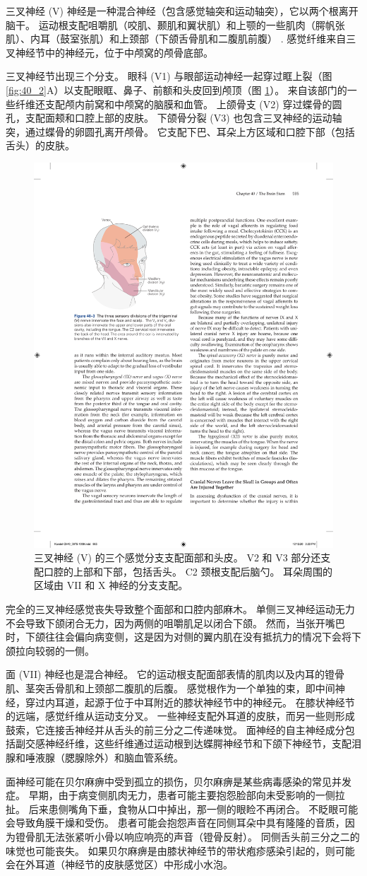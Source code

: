 三叉神经 (V) 神经是一种混合神经（包含感觉轴突和运动轴突），它以两个根离开脑干。 运动根支配咀嚼肌（咬肌、颞肌和翼状肌）和上颚的一些肌肉（腭帆张肌）、内耳（鼓室张肌）和上颈部（下颌舌骨肌和二腹肌前腹） . 感觉纤维来自三叉神经节中的神经元，位于中颅窝的颅骨底部。

三叉神经节出现三个分支。 
眼科 (V1) 与眼部运动神经一起穿过眶上裂（图 \ref{fig:40_2}A）以支配眼眶、鼻子、前额和头皮回到颅顶（图 \ref{fig:40_3}）。 
来自该部门的一些纤维还支配颅内前窝和中颅窝的脑膜和血管。 上颌骨支 (V2) 穿过蝶骨的圆孔，支配面颊和口腔上部的皮肤。 下颌骨分裂 (V3) 也包含三叉神经的运动轴突，通过蝶骨的卵圆孔离开颅骨。 它支配下巴、耳朵上方区域和口腔下部（包括舌头）的皮肤。

\begin{figure}[htbp]
	\centering
	\includegraphics[width=0.4\linewidth]{chap40/fig_40_3}
	\caption{三叉神经 (V) 的三个感觉分支支配面部和头皮。 V2 和 V3 部分还支配口腔的上部和下部，包括舌头。 C2 颈根支配后脑勺。 耳朵周围的区域由 VII 和 X 神经的分支支配。}
	\label{fig:40_3}
\end{figure}

完全的三叉神经感觉丧失导致整个面部和口腔内部麻木。 单侧三叉神经运动无力不会导致下颌闭合无力，因为两侧的咀嚼肌足以闭合下颌。 然而，当张开嘴巴时，下颌往往会偏向病变侧，这是因为对侧的翼内肌在没有抵抗力的情况下会将下颌拉向较弱的一侧。

面 (VII) 神经也是混合神经。 它的运动根支配面部表情的肌肉以及内耳的镫骨肌、茎突舌骨肌和上颈部二腹肌的后腹。 感觉根作为一个单独的束，即中间神经，穿过内耳道，起源于位于中耳附近的膝状神经节中的神经元。 在膝状神经节的远端，感觉纤维从运动支分叉。 一些神经支配外耳道的皮肤，而另一些则形成鼓索，它连接舌神经并从舌头的前三分之二传递味觉。 面神经的自主神经成分包括副交感神经纤维，这些纤维通过运动根到达蝶腭神经节和下颌下神经节，支配泪腺和唾液腺（腮腺除外）和脑血管系统。

面神经可能在贝尔麻痹中受到孤立的损伤，贝尔麻痹是某些病毒感染的常见并发症。 早期，由于病变侧肌肉无力，患者可能主要抱怨脸部向未受影响的一侧拉扯。 后来患侧嘴角下垂，食物从口中掉出，那一侧的眼睑不再闭合。 不眨眼可能会导致角膜干燥和受伤。 患者可能会抱怨声音在同侧耳朵中具有隆隆的音质，因为镫骨肌无法张紧听小骨以响应响亮的声音（镫骨反射）。 同侧舌头前三分之二的味觉也可能丧失。 如果贝尔麻痹是由膝状神经节的带状疱疹感染引起的，则可能会在外耳道（神经节的皮肤感觉区）中形成小水泡。

